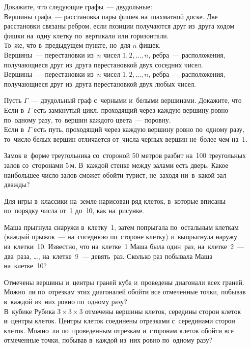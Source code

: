 \begin{problems}

\item
Докажите, что следующие графы~--- двудольные:
\\
\sp
Вершины графа~--- расстановка пары фишек на~шахматной доске.
Две расстановки связаны ребром, если позиции получаются друг из~друга ходом
фишки на~одну клетку по~вертикали или горизонтали.
\\
\sp
То~же, что в~предыдущем пункте, но~для $n$ фишек.
\\
\sp
Вершины~--- перестановки из~$n$ чисел $1, 2, \ldots, n$, ребра~---
расположения, получающиеся друг из~друга перестановкой двух соседних чисел.
\\
\sp
Вершины~--- перестановки из~$n$ чисел $1, 2, \ldots, n$, ребра~---
расположения, получающиеся друг из~друга перестановкой двух любых чисел.

\item
Пусть $\Gamma$~--- двудольный граф с~черными и~белыми вершинами.
Докажите, что
\\
\sp
Если в~$\Gamma$ есть замкнутый цикл, проходящий через каждую вершину ровно
по~одному разу, то~вершин каждого цвета~--- поровну.
\\
\sp
Если в~$\Gamma$ есть путь, проходящий через каждую вершину ровно по~одному
разу, то~число белых вершин отличается от~числа черных вершин не~более чем
на~1.

\item
Замок в~форме треугольника со~стороной 50 метров разбит на~100 треугольных
залов со~сторонами $5\,\text{м}$.
В~каждой стенке между залами есть дверь.
Какое наибольшее число залов сможет обойти турист, не~заходя ни~в~какой зал
дважды?

\item
Для игры в~классики на~земле нарисован ряд клеток, в~которые вписаны по~порядку
числа от~1 до~10, как на~рисунке.
\begin{center}
\end{center}
Маша прыгнула снаружи в~клетку~1, затем попрыгала по~остальным клеткам
(каждый прыжок~--- на~соседнюю по~стороне клетку) и~выпрыгнула наружу
из~клетки~10.
Известно, что на~клетке~1 Маша была один~раз, на~клетке~2~--- два~раза, \ldots,
на~клетке~9~--- девять~раз.
Сколько раз побывала Маша на~клетке~10?

\item
\sp
Отмечены вершины и~центры граней куба и~проведены диагонали всех граней.
Можно~ли по~отрезкам этих диагоналей обойти все отмеченные точки, побывав
в~каждой из~них ровно по~одному разу?
\\
\sp
В~кубике Рубика $3 \times 3 \times 3$ отмечены вершины клеток, середины сторон
клеток и~центры клеток.
Центры клеток соединены отрезками с~серединами сторон клеток.
Можно~ли по~проведенным отрезкам и~сторонам клеток обойти все отмеченные точки,
побывав в~каждой из~них ровно по~одному разу?

\end{problems}

